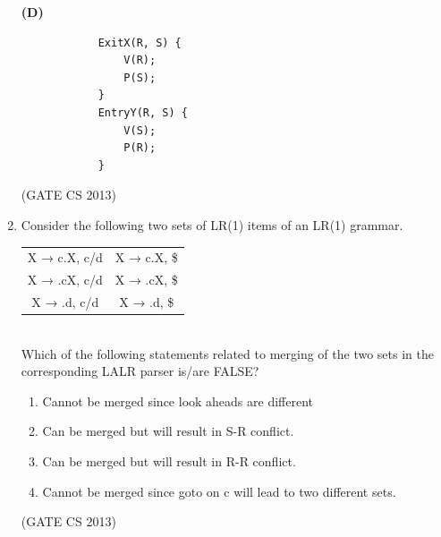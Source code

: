 \documentclass[a4paper, 11pt]{article}
\begin{document}
\begin{enumerate}
\begin{minipage}{0.45\textwidth}
            \medskip
            \textbf{(D)}
            \begin{lstlisting}
            ExitX(R, S) {
                V(R);
                P(S);
            }
            EntryY(R, S) {
                V(S);
                P(R);
            }
            \end{lstlisting}
            \end{minipage}

            \hfill (GATE CS 2013)
    \item Consider the following two sets of LR(1) items of an LR(1) grammar. \\
    \begin{tabular}{cc}
        X → c.X, c/d & X → c.X, \$  \\
        X → .cX, c/d & X → .cX, \$ \\
        X → .d, c/d  & X → .d, \$ 

    \end{tabular}\\
    Which of the following statements related to merging of the two sets in the corresponding LALR parser is/are FALSE?
    \begin{enumerate}[label=\arabic*]
        \item Cannot be merged since look aheads are different
        \item Can be merged but will result in S-R conflict. 
        \item Can be merged but will result in R-R conflict. 
        \item Cannot be merged since goto on c will lead to two different sets.
    \end{enumerate}
    \begin{enumerate}
    \end{enumerate}
    \hfill (GATE CS 2013)


\end{enumerate}
\end{document}
